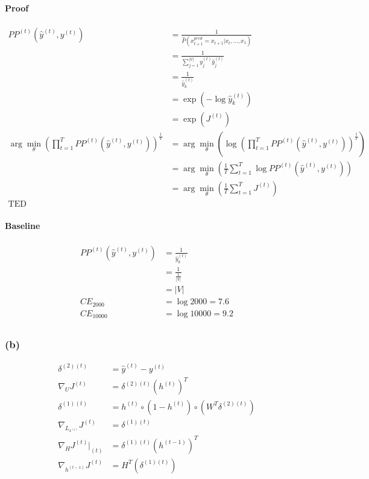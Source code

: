 \documentclass{article}
\begin{document}
\paragraph{Proof}
\begin{align*}
PP^{(t)}(\hat{y}^{(t)}, y^{(t)}) 
&= \frac{1}{\hat{P}(x^{pred}_{t+1}=x_{t+1}|x_t, ..., x_1)}\\
&= \frac{1}{\sum_{j=1}^{|V|}y^{(t)}_j \hat{y}^{(t)}_j} \\
&= \frac{1}{\hat{y}^{(t)}_k} \\
&= \exp(-\log \hat{y}^{(t)}_k)\\
&= \exp(J^{(t)}) \\	
\arg\min_{\theta} \left(\prod_{t=1}^{T}PP^{(t)}(\hat{y}^{(t)}, y^{(t)})\right)^{\frac{1}{T}} &= \arg\min_{\theta} \left( \log \left(\prod_{t=1}^{T}PP^{(t)}(\hat{y}^{(t)}, y^{(t)})\right)^{\frac{1}{T}} \right) \\
&= \arg\min_{\theta} \left(\frac{1}{T}\sum_{t=1}^{T} \log PP^{(t)}(\hat{y}^{(t)}, y^{(t)})\right) \\
&= \arg\min_{\theta} \left(\frac{1}{T}\sum_{t=1}^{T} J^{(t)} \right)\\
\text{TED}
\end{align*}

\paragraph{Baseline}
\begin{align*}
PP^{(t)}(\hat{y}^{(t)}, y^{(t)}) 
&= \frac{1}{\hat{y}^{(t)}_k} \\
&= \frac{1}{\frac{1}{|V|}} \\
&= |V| \\
CE_{2000} &= \log 2000 = 7.6 \\
CE_{10000} &= \log 10000 = 9.2 \\
\end{align*}
\subsubsection*{(b)}
\begin{align*}
\delta^{(2)(t)} &= \hat{y}^{(t)} - y^{(t)} \\
\nabla_U J^{(t)} &= \delta^{(2)(t)} (h^{(t)})^T \\
\delta^{(1)(t)} &= h^{(t)} \circ (1 - h^{(t)}) \circ (W^T \delta^{(2)(t)}) \\
\nabla_{L_{x^{(t)}}} J^{(t)} &= \delta^{(1)(t)} \\
\nabla_{H} J^{(t)} \big|_{(t)} &= \delta^{(1)(t)} (h^{(t-1)})^T \\
\nabla_{h^{(t-1)}} J^{(t)} &= H^T (\delta^{(1)(t)}) 
\end{align*}
\end{document}
